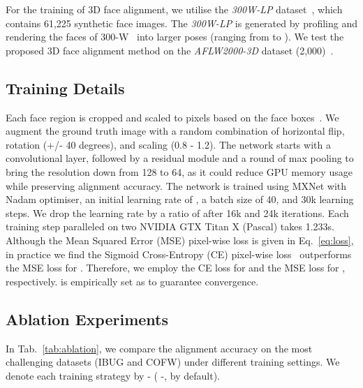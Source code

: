 \documentclass{bmvc2k}
\begin{document}
For the training of 3D face alignment, we utilise the {\em 300W-LP} dataset~\cite{zhu2016face}, which contains 61,225 synthetic face
images. The {\em 300W-LP} is generated by profiling and rendering the faces of 300-W~\cite{sagonas2016300} into larger poses (ranging from  to ). We test the proposed 3D face alignment method on the {\em AFLW2000-3D} dataset (2,000)~\cite{zhu2016face}.

\subsection{Training Details}

Each face region is cropped and scaled to  pixels based on the face boxes~\cite{zhang2016joint}. We augment the ground truth image with a random combination of horizontal flip, rotation (+/- 40 degrees), and scaling (0.8 - 1.2). The network starts with a  convolutional layer, followed by a residual module and a round of max pooling to bring the resolution down from 128 to 64, as it could reduce GPU memory usage while preserving alignment accuracy. The network is trained using MXNet with Nadam optimiser, an initial learning rate of , a batch size of 40, and 30k learning steps. 
We drop the learning rate by a ratio of  after 16k and 24k iterations. Each training step paralleled on two NVIDIA GTX Titan X (Pascal) takes 1.233s. Although the Mean Squared Error (MSE) pixel-wise loss is given in Eq.~\ref{eq:loss}, in practice we find the Sigmoid Cross-Entropy (CE) pixel-wise loss~\cite{bulat2017binarized} outperforms the MSE loss for . Therefore, we employ the CE loss for  and the MSE loss for , respectively.  is empirically set as  to guarantee convergence.



\subsection{Ablation Experiments}

In Tab.~\ref{tab:ablation}, we compare the alignment accuracy on the most challenging datasets (IBUG and COFW) under different training settings. We denote each training strategy by - ( -,  by default). 
\end{document}
